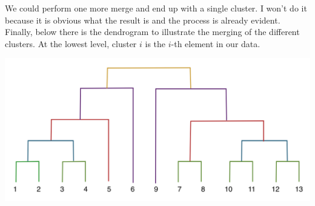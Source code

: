 \documentclass[11pt]{article}
\begin{document}
We could perform one more merge and end up with a single cluster. I won't do it because it is obvious what the result is  and the process is already evident.\\

Finally, below there is the dendrogram to illustrate the merging of the different clusters. At the lowest level, cluster $i$ is the $i$-th element in our data.

\begin{center}
\includegraphics[scale=0.57]{dendrogram.png}
\end{center}
\end{document}
